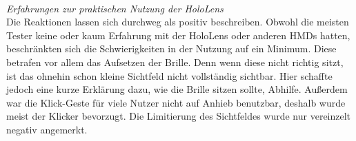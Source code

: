 \vspace{8px}
\begin{center}
	\\
\end{center}
\vspace{6px}

\textit{Erfahrungen zur praktischen Nutzung der HoloLens}\\
Die Reaktionen lassen sich durchweg als positiv beschreiben. Obwohl die meisten Tester keine oder kaum Erfahrung mit der HoloLens oder anderen HMDs hatten, beschränkten sich die Schwierigkeiten in der Nutzung auf ein Minimum. Diese betrafen vor allem das Aufsetzen der Brille. Denn wenn diese nicht richtig sitzt, ist das ohnehin schon kleine Sichtfeld nicht vollständig sichtbar. Hier schaffte jedoch eine kurze Erklärung dazu, wie die Brille sitzen sollte, Abhilfe. Außerdem war die Klick-Geste für viele Nutzer nicht auf Anhieb benutzbar, deshalb wurde meist der Klicker bevorzugt. Die Limitierung des Sichtfeldes wurde nur vereinzelt negativ angemerkt.\\

